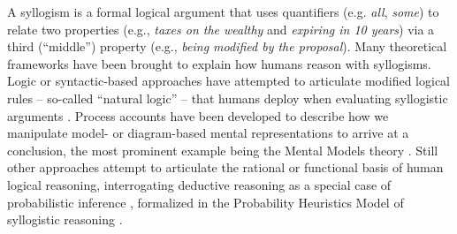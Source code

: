 \documentclass[floatsintext, doc]{apa6}
\begin{document}





A syllogism is a formal logical argument that uses quantifiers (e.g. \emph{all}, \emph{some}) to relate two properties (e.g., \emph{taxes on the wealthy} and \emph{expiring in 10 years}) via a third (``middle'') property (e.g., \emph{being modified by the proposal}). 
Many theoretical frameworks have been brought to explain how humans reason with syllogisms.
Logic or syntactic-based approaches have attempted to articulate modified logical rules -- so-called ``natural logic'' -- that humans deploy when evaluating syllogistic arguments \cite{braine1983logical, rips1994, geurts2003reasoning}.
Process accounts have been developed to describe how we manipulate  model- or diagram-based mental representations to arrive at a conclusion, the most prominent example being the Mental Models theory \cite{johnson1975models}.
Still other approaches attempt to articulate the rational or functional basis of human logical reasoning, interrogating deductive reasoning as a special case of probabilistic inference \cite{oaksford2001probabilistic, oaksford2007bayesian, hahn2007rationality, tenenbaum2006theory},  formalized in the Probability Heuristics Model of syllogistic reasoning \cite{Chater1999}.



\end{document}
